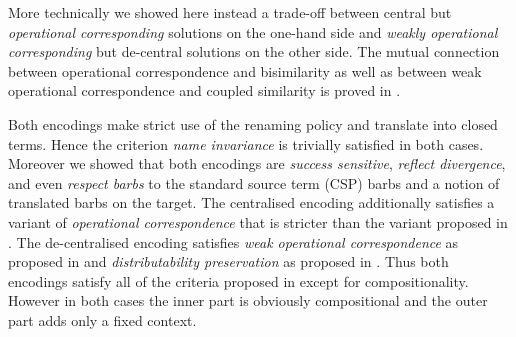 \documentclass[]{eptcs}
\begin{document}
More technically we showed here instead a trade-off between central but \emph{operational corresponding} solutions on the one-hand side and \emph{weakly operational corresponding} but de-central solutions on the other side.
The mutual connection between operational correspondence and bisimilarity as well as between weak operational correspondence and coupled similarity is proved in \cite{petersGlabbeek15}.

Both encodings make strict use of the renaming policy and translate into closed terms.
Hence the criterion \emph{name invariance} is trivially satisfied in both cases.
Moreover we showed that both encodings are \emph{success sensitive}, \emph{reflect divergence}, and even \emph{respect barbs} \wrt to the standard source term (CSP) barbs and a notion of translated barbs on the target.
The centralised encoding  additionally satisfies a variant of \emph{operational correspondence} that is stricter than the variant proposed in \cite{gorla10}.
The de-centralised encoding  satisfies \emph{weak operational correspondence} as proposed in \cite{gorla10} and \emph{distributability preservation} as proposed in \cite{petersNestmannGoltz13}.
Thus both encodings satisfy all of the criteria proposed in \cite{gorla10} except for compositionality.
However in both cases the inner part is obviously compositional and the outer part adds only a fixed context.
\end{document}
